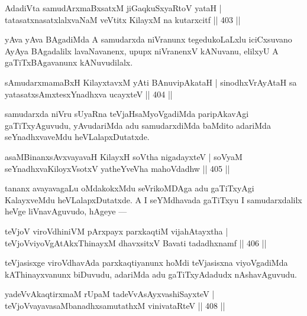 
\begin{shl}
AdadiVta samudArxmaBxsatxM jiGaqkuSxyaRtoV yataH |
tatasatxnasatxlalxvaNaM veVtitx KilayxM na kutarxcitf \hfill || 403 ||
\end{shl}

\begin{artha}
yAva yAva BAgadiMda A samudarxda niVranunx tegedukoLaLxlu iciCxsuvano AyAya BAgadalilx lavaNavanenx, upupx niVranenxV kANuvanu, elilxyU A gaTiTxBAgavanunx kANuvudilalx.
\end{artha}


\begin{shl}
sAmudarxmamaBxH KilayxtavxM yAti BAnuvipAkataH |
sinodhxVrAyAtaH sa yatasatxsAmxtesxYnadhxva ucayxteV \hfill || 404 ||
\end{shl}

\begin{artha}
samudarxda niVru sUyaRna teVjaHsaMyoVgadiMda paripAkavAgi gaTiTxyAguvudu, yAvudariMda adu samudarxdiMda baMdito adariMda seYnadhxvaveMdu heVLalapxDutatxde.
\end{artha}

\begin{shl}
asaMBinanxsAvxvayavaH KilayxH soV\s tha nigadayxteV |
soV\s yaM seYnadhxvaKiloyxV\s sotxV yatheYveVha mahoVdadhw \hfill || 405 ||
\end{shl}

\begin{artha}
tananx avayavagaLu oMdakokxMdu seVrikoMDAga adu gaTiTxyAgi KalayxveMdu heVLalapxDutatxde. A I seYMdhavada gaTiTxyu I samudarxdalilx heVge liVnavAguvudo, hAgeye  {\rm ---} 
\end{artha}

\begin{shl}
teVjoV viroVdhiniVM pArxpayx parxkaqtiM vijahAtayxtha |
teVjoVviyoVgAtAkxThinayxM dhavxsitxV Bavati tadadhxnamf \hfill || 406 ||
\end{shl}

\begin{artha}
teVjasisxge viroVdhavAda parxkaqtiyanunx hoMdi teVjasisxna viyoVgadiMda kAThinayxvanunx biDuvudu, adariMda adu gaTiTxyAdadudx nAshavAguvudu.
\end{artha}

\begin{shl}
yadeVvAkaqtirxmaM rUpaM tadeVvAsAyxvashiSayxteV |
teVjoVvayavasaMbanadhxsamutathxM vinivataRteV \hfill  || 408 ||
\end{shl}

